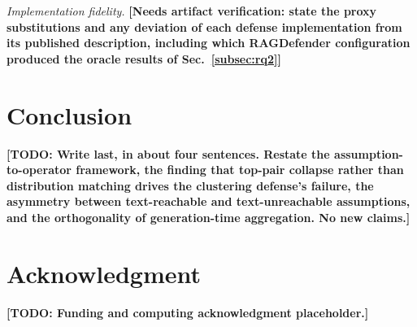 \documentclass[conference]{IEEEtran}
\newcommand{\VERIFY}[1]{\textbf{[Needs artifact verification: #1]}}
\newcommand{\TODO}[1]{\textbf{[TODO: #1]}}
\begin{document}
\textit{Implementation fidelity.} \VERIFY{state the proxy substitutions and any
deviation of each defense implementation from its published description,
including which RAGDefender configuration produced the oracle results of
Sec.~\ref{subsec:rq2}}

\section{Conclusion}
\label{sec:conclusion}
\TODO{Write last, in about four sentences. Restate the assumption-to-operator
framework, the finding that top-pair collapse rather than distribution matching
drives the clustering defense's failure, the asymmetry between text-reachable and
text-unreachable assumptions, and the orthogonality of generation-time
aggregation. No new claims.}

\section*{Acknowledgment}
\TODO{Funding and computing acknowledgment placeholder.}




\end{document}
